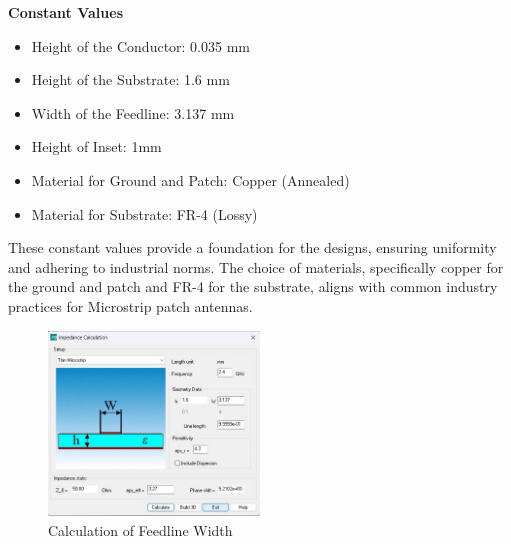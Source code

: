 \documentclass[a4paper,12pt]{report}
\begin{document}
\textbf{Constant Values}
\begin{itemize}
    \item Height of the Conductor: 0.035 mm
    \item Height of the Substrate: 1.6 mm
    \item Width of the Feedline: 3.137 mm
    \item Height of Inset: 1mm
    \item Material for Ground and Patch: Copper (Annealed)
    \item Material for Substrate: FR-4 (Lossy)
\end{itemize}



These constant values provide a foundation for the designs, ensuring uniformity and adhering to industrial norms. The choice of materials, specifically copper for the ground and patch and FR-4 for the substrate, aligns with common industry practices for Microstrip patch antennas.

\vspace{10pt} %

\begin{figure}[H]
    \centering
    \includegraphics[width=0.5\textwidth]{widthcalculator.png}
    \caption{Calculation of Feedline Width}
    \label{fig:width_calculator}
\end{figure}

\vspace{10pt} %
\end{document}
